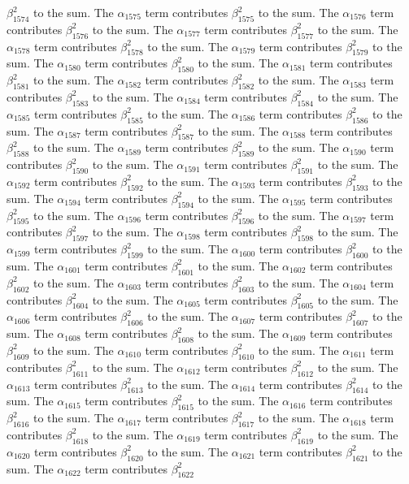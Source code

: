 \begin{lemma}
$\beta_{1574}^{2}$ to the sum. The $\alpha_{1575}$ term contributes $\beta_{1575}^{2}$ to the sum. The $\alpha_{1576}$ term contributes $\beta_{1576}^{2}$ to the sum. The $\alpha_{1577}$ term contributes $\beta_{1577}^{2}$ to the sum. The $\alpha_{1578}$ term contributes $\beta_{1578}^{2}$ to the sum. The $\alpha_{1579}$ term contributes $\beta_{1579}^{2}$ to the sum. The $\alpha_{1580}$ term contributes $\beta_{1580}^{2}$ to the sum. The $\alpha_{1581}$ term contributes $\beta_{1581}^{2}$ to the sum. The $\alpha_{1582}$ term contributes $\beta_{1582}^{2}$ to the sum. The $\alpha_{1583}$ term contributes $\beta_{1583}^{2}$ to the sum. The $\alpha_{1584}$ term contributes $\beta_{1584}^{2}$ to the sum. The $\alpha_{1585}$ term contributes $\beta_{1585}^{2}$ to the sum. The $\alpha_{1586}$ term contributes $\beta_{1586}^{2}$ to the sum. The $\alpha_{1587}$ term contributes $\beta_{1587}^{2}$ to the sum. The $\alpha_{1588}$ term contributes $\beta_{1588}^{2}$ to the sum. The $\alpha_{1589}$ term contributes $\beta_{1589}^{2}$ to the sum. The $\alpha_{1590}$ term contributes $\beta_{1590}^{2}$ to the sum. The $\alpha_{1591}$ term contributes $\beta_{1591}^{2}$ to the sum. The $\alpha_{1592}$ term contributes $\beta_{1592}^{2}$ to the sum. The $\alpha_{1593}$ term contributes $\beta_{1593}^{2}$ to the sum. The $\alpha_{1594}$ term contributes $\beta_{1594}^{2}$ to the sum. The $\alpha_{1595}$ term contributes $\beta_{1595}^{2}$ to the sum. The $\alpha_{1596}$ term contributes $\beta_{1596}^{2}$ to the sum. The $\alpha_{1597}$ term contributes $\beta_{1597}^{2}$ to the sum. The $\alpha_{1598}$ term contributes $\beta_{1598}^{2}$ to the sum. The $\alpha_{1599}$ term contributes $\beta_{1599}^{2}$ to the sum. The $\alpha_{1600}$ term contributes $\beta_{1600}^{2}$ to the sum. The $\alpha_{1601}$ term contributes $\beta_{1601}^{2}$ to the sum. The $\alpha_{1602}$ term contributes $\beta_{1602}^{2}$ to the sum. The $\alpha_{1603}$ term contributes $\beta_{1603}^{2}$ to the sum. The $\alpha_{1604}$ term contributes $\beta_{1604}^{2}$ to the sum. The $\alpha_{1605}$ term contributes $\beta_{1605}^{2}$ to the sum. The $\alpha_{1606}$ term contributes $\beta_{1606}^{2}$ to the sum. The $\alpha_{1607}$ term contributes $\beta_{1607}^{2}$ to the sum. The $\alpha_{1608}$ term contributes $\beta_{1608}^{2}$ to the sum. The $\alpha_{1609}$ term contributes $\beta_{1609}^{2}$ to the sum. The $\alpha_{1610}$ term contributes $\beta_{1610}^{2}$ to the sum. The $\alpha_{1611}$ term contributes $\beta_{1611}^{2}$ to the sum. The $\alpha_{1612}$ term contributes $\beta_{1612}^{2}$ to the sum. The $\alpha_{1613}$ term contributes $\beta_{1613}^{2}$ to the sum. The $\alpha_{1614}$ term contributes $\beta_{1614}^{2}$ to the sum. The $\alpha_{1615}$ term contributes $\beta_{1615}^{2}$ to the sum. The $\alpha_{1616}$ term contributes $\beta_{1616}^{2}$ to the sum. The $\alpha_{1617}$ term contributes $\beta_{1617}^{2}$ to the sum. The $\alpha_{1618}$ term contributes $\beta_{1618}^{2}$ to the sum. The $\alpha_{1619}$ term contributes $\beta_{1619}^{2}$ to the sum. The $\alpha_{1620}$ term contributes $\beta_{1620}^{2}$ to the sum. The $\alpha_{1621}$ term contributes $\beta_{1621}^{2}$ to the sum. The $\alpha_{1622}$ term contributes $\beta_{1622}^{2}$ 
\end{lemma}
